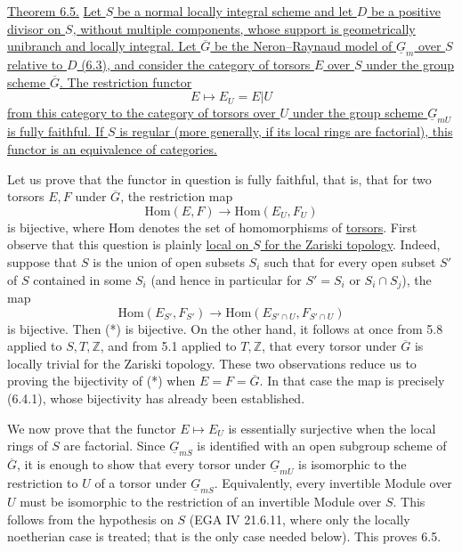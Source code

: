 
\medskip
\noindent\underline{Theorem 6.5.}  \underline{Let $S$ be a normal locally
integral scheme and let $D$ be a positive divisor on $S$, without multiple
components, whose support is geometrically unibranch and locally integral.
Let $\overline G$ be the Neron--Raynaud model of $\underline G_m$ over $S$
relative to $D$ (6.3), and consider the category of torsors $E$ over $S$
under the group scheme $\overline G$.  The restriction functor}
\[
 E\longmapsto E_U=E|U
\]
\underline{from this category to the category of torsors over $U$ under the
group scheme $\underline G_{mU}$ is fully faithful.  If $S$ is regular (more
generally, if its local rings are factorial), this functor is an equivalence
of categories.}

Let us prove that the functor in question is fully faithful, that is, that
for two torsors $E,F$ under $\overline G$, the restriction map
\begin{equation}\tag{*}
 \mathrm{Hom}(E,F)\longrightarrow\mathrm{Hom}(E_U,F_U)
\end{equation}
is bijective, where $\mathrm{Hom}$ denotes the set of homomorphisms of
\underline{torsors}.  First observe that this question is plainly
\underline{local on $S$ for the Zariski topology}.  Indeed, suppose that
$S$ is the union of open subsets $S_i$ such that for every open subset $S'$
of $S$ contained in some $S_i$ (and hence in particular for $S'=S_i$ or
$S_i\cap S_j$), the map
\[
 \mathrm{Hom}(E_{S'},F_{S'})
 \longrightarrow
 \mathrm{Hom}(E_{S'\cap U},F_{S'\cap U})
\]
is bijective.  Then (*) is bijective.  On the other hand, it follows at once
from 5.8 applied to $S,T,\mathbb Z$, and from 5.1 applied to $T,\mathbb Z$,
that every torsor under $\overline G$ is locally trivial for the Zariski
topology.  These two observations reduce us to proving the bijectivity of
(*) when $E=F=\overline G$.  In that case the map is precisely (6.4.1),
whose bijectivity has already been established.

We now prove that the functor $E\mapsto E_U$ is essentially surjective when
the local rings of $S$ are factorial.  Since $\underline G_{mS}$ is
identified with an open subgroup scheme of $\overline G$, it is enough to
show that every torsor under $\underline G_{mU}$ is isomorphic to the
restriction to $U$ of a torsor under $\underline G_{mS}$.  Equivalently,
every invertible Module over $U$ must be isomorphic to the restriction of an
invertible Module over $S$.  This follows from the hypothesis on $S$
(EGA IV 21.6.11, where only the locally noetherian case is treated; that is
the only case needed below).  This proves 6.5.


